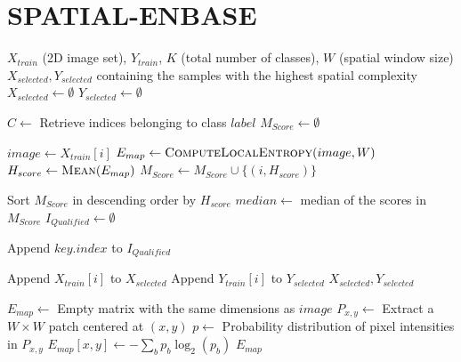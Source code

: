 \documentclass[11pt,a4paper]{article}
\begin{document}
\section{SPATIAL-ENBASE}

\begin{algorithm}[H]
\label{alg:spatial-enbase}
\caption{Spatial-EnBaSe: Selection Based on Local Entropy and Structural Information}
\begin{algorithmic}[1]
\Require $X_{train}$ (2D image set), $Y_{train}$, $K$ (total number of classes), $W$ (spatial window size)
\Ensure $X_{selected}, Y_{selected}$ containing the samples with the highest spatial complexity
\State $X_{selected} \gets \emptyset$
\State $Y_{selected} \gets \emptyset$

  \State $C \gets$ Retrieve indices belonging to class $label$
  \State $M_{Score} \gets \emptyset$
  
    \State $image \gets X_{train}[i]$
    \State $E_{map} \gets \Call{ComputeLocalEntropy}{image, W}$
    \State $H_{score} \gets \Call{Mean}{E_{map}}$ 
    \State $M_{Score} \gets M_{Score} \cup \{(i, H_{score})\}$
  \EndFor
  
  \State Sort $M_{Score}$ in descending order by $H_{score}$
  \State $median \gets$ median of the scores in $M_{Score}$
  \State $I_{Qualified} \gets \emptyset$
  
     
      \State Append $key.index$ to $I_{Qualified}$
    \EndIf
  \EndFor
  
    \State Append $X_{train}[i]$ to $X_{selected}$
    \State Append $Y_{train}[i]$ to $Y_{selected}$
  \EndFor
\EndFor
\State \Return $X_{selected}, Y_{selected}$

\Statex
{}
  \State $E_{map} \gets$ Empty matrix with the same dimensions as $image$
    \State $P_{x,y} \gets$ Extract a $W \times W$ patch centered at $(x,y)$
    \State $p \gets$ Probability distribution of pixel intensities in $P_{x,y}$
    \State $E_{map}[x,y] \gets -\sum_{b} p_b \log_{2}(p_b)$
  \EndFor
  \State \Return $E_{map}$
\EndFunction
\end{algorithmic}
\end{algorithm}



\end{document}
